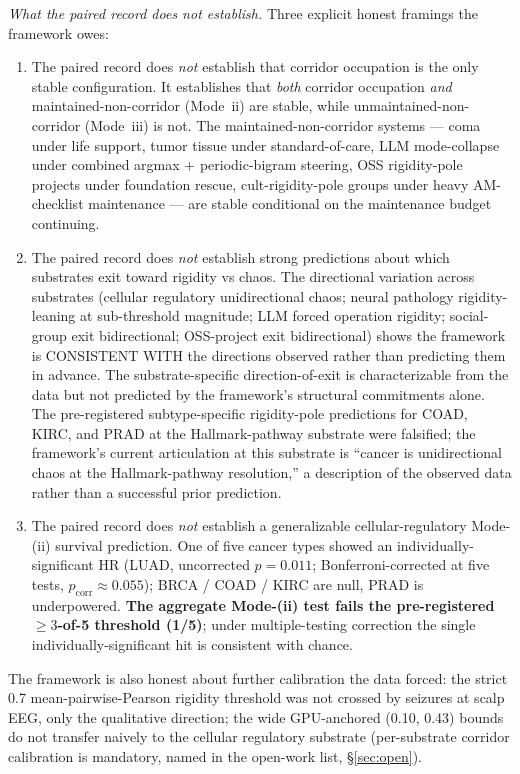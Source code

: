 \documentclass[11pt,a4paper]{article}
\begin{document}
\emph{What the paired record does not establish.} Three explicit honest framings the framework owes:
\begin{enumerate}[leftmargin=*,itemsep=2pt]
\item The paired record does \emph{not} establish that corridor occupation is the only stable configuration. It establishes that \emph{both} corridor occupation \emph{and} maintained-non-corridor (Mode~ii) are stable, while unmaintained-non-corridor (Mode~iii) is not. The maintained-non-corridor systems --- coma under life support, tumor tissue under standard-of-care, LLM mode-collapse under combined argmax + periodic-bigram steering, OSS rigidity-pole projects under foundation rescue, cult-rigidity-pole groups under heavy AM-checklist maintenance --- are stable conditional on the maintenance budget continuing.
\item The paired record does \emph{not} establish strong predictions about which substrates exit toward rigidity vs chaos. The directional variation across substrates (cellular regulatory unidirectional chaos; neural pathology rigidity-leaning at sub-threshold magnitude; LLM forced operation rigidity; social-group exit bidirectional; OSS-project exit bidirectional) shows the framework is CONSISTENT WITH the directions observed rather than predicting them in advance. The substrate-specific direction-of-exit is characterizable from the data but not predicted by the framework's structural commitments alone. The pre-registered subtype-specific rigidity-pole predictions for COAD, KIRC, and PRAD at the Hallmark-pathway substrate were falsified; the framework's current articulation at this substrate is ``cancer is unidirectional chaos at the Hallmark-pathway resolution,'' a description of the observed data rather than a successful prior prediction.
\item The paired record does \emph{not} establish a generalizable cellular-regulatory Mode-(ii) survival prediction. One of five cancer types showed an individually-significant HR (LUAD, uncorrected $p = 0.011$; Bonferroni-corrected at five tests, $p_{\text{corr}} \approx 0.055$); BRCA / COAD / KIRC are null, PRAD is underpowered. \textbf{The aggregate Mode-(ii) test fails the pre-registered $\ge 3$-of-5 threshold (1/5)}; under multiple-testing correction the single individually-significant hit is consistent with chance.
\end{enumerate}

The framework is also honest about further calibration the data forced: the strict 0.7 mean-pairwise-Pearson rigidity threshold was not crossed by seizures at scalp EEG, only the qualitative direction; the wide GPU-anchored (0.10, 0.43) bounds do not transfer naively to the cellular regulatory substrate (per-substrate corridor calibration is mandatory, named in the open-work list, \S\ref{sec:open}).
\end{document}
